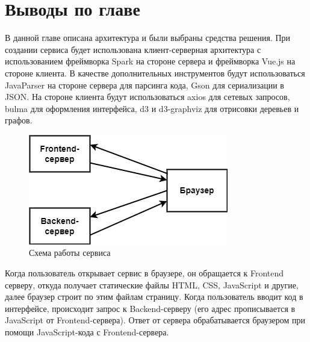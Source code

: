 \section{Выводы по главе} \label{ch4:sec6}
В данной главе описана архитектура и были выбраны средства решения. При создании сервиса будет использована клиент-серверная архитектура с использованием фреймворка Spark на стороне сервера и фреймворка Vue.js на стороне клиента. В качестве дополнительных инструментов будут использоваться JavaParser на стороне сервера для парсинга кода, Gson для сериализации в JSON. На стороне клиента будут использоваться axios для сетевых запросов, bulma для оформления интерфейса, d3 и d3-graphviz для отрисовки деревьев и графов.\\
\begin{figure}[h]
	\center
	\includegraphics [scale=1] {my_folder/images/my/19}
	\caption{Схема работы сервиса} 
	\label{fig:19}  
\end{figure}

Когда пользователь открывает сервис в браузере, он обращается к Frontend серверу, откуда получает статические файлы HTML, CSS, JavaScript и другие, далее браузер строит по этим файлам страницу. Когда пользователь вводит код в интерфейсе, происходит запрос к Backend-серверу (его адрес прописывается в JavaScript от Frontend-сервера). Ответ от сервера обрабатывается браузером при помощи JavaScript-кода с Frontend-сервера.
\newpage















